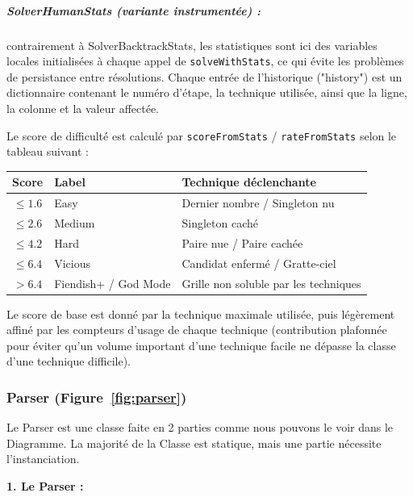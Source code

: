 \documentclass[a4paper]{article}
\begin{document}
\subparagraph{SolverHumanStats (variante instrumentée) :}
contrairement à SolverBacktrackStats, les statistiques sont ici des variables
locales initialisées à chaque appel de \texttt{solveWithStats}, ce qui évite les
problèmes de persistance entre résolutions. Chaque entrée de l'historique ("history")
est un dictionnaire contenant le numéro d'étape, la technique utilisée, ainsi que la ligne,
la colonne et la valeur affectée.

\medskip
Le score de difficulté est calculé par \texttt{scoreFromStats} / \texttt{rateFromStats} selon
le tableau suivant :

\begin{center}
\renewcommand{\arraystretch}{1.3}
\begin{tabular}{cll}
  \toprule
  \textbf{Score} & \textbf{Label} & \textbf{Technique déclenchante} \\
  \midrule
  $\leq 1.6$ & Easy        & Dernier nombre / Singleton nu \\
  $\leq 2.6$ & Medium      & Singleton caché \\
  $\leq 4.2$ & Hard        & Paire nue / Paire cachée \\
  $\leq 6.4$ & Vicious     & Candidat enfermé / Gratte-ciel \\
  $> 6.4$    & Fiendish+ / God Mode & Grille non soluble par les techniques \\
  \bottomrule
\end{tabular}
\end{center}

Le score de base est donné par la technique maximale utilisée, puis légèrement affiné par
les compteurs d'usage de chaque technique (contribution plafonnée pour éviter qu'un volume
important d'une technique facile ne dépasse la classe d'une technique difficile).


\subsubsection{Parser   (\textbf{Figure~\ref{fig:parser}})}

Le Parser est une classe faite en 2 parties comme nous pouvons le voir dans le Diagramme. La majorité de la Classe est statique, mais une partie nécessite l’instanciation.

\textbf{1. Le Parser :}
\end{document}
